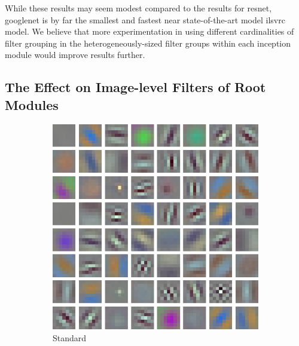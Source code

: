 \documentclass[thesis]{subfiles}
\begin{document}
	While these results may seem modest compared to the results for \gls{resnet}, \gls{googlenet} is by far the smallest and fastest near state-of-the-art model \gls{ilsvrc} model. We believe that more experimentation in using different cardinalities of filter grouping in the heterogeneously-sized filter groups within each \gls{inception} module would improve results further.
	
	\subsection{The Effect on Image-level Filters of Root Modules}
	\begin{figure}[tb]
		\centering
		\begin{subfigure}[b]{0.45\textwidth}
			\centering
			\includegraphics[width=\textwidth]{Figs/Raster/msrc-resnet-50-conv1}
			\caption{Standard}
			\label{fig:resnet50normalconv0}
		\end{subfigure}
		~
		\begin{subfigure}[b]{0.45\textwidth}
			\centering

\end{subfigure}
\end{figure}
\end{document}
